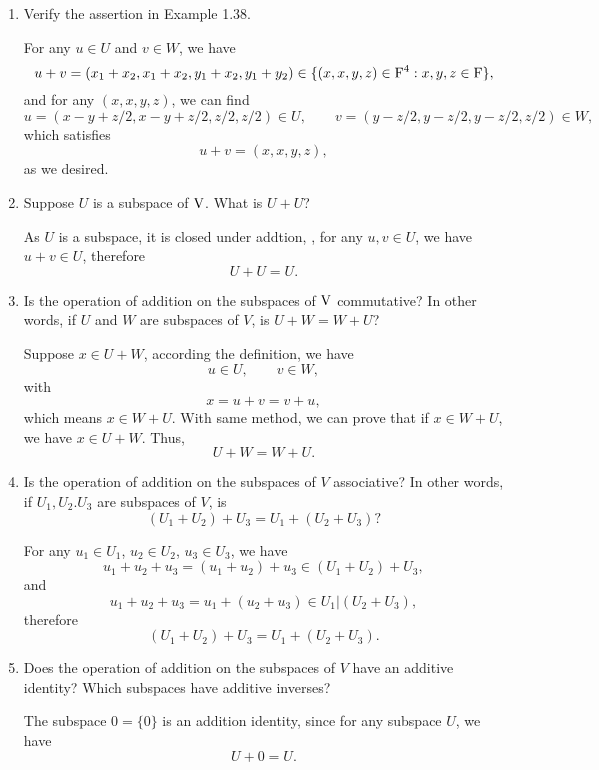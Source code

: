 \begin{enumerate}
\begin{solution}
        \end{solution}
    \item Verify the assertion in Example 1.38.
        \begin{solution}
            For any $u \in U$ and $v \in W$, we have 
            \[ u+v = (x_1+x_2, x_1+x_2, y_1 + x_2, y_1 + y_2) \in \{(x,x,y,z)\in \mathrm{F}^4:x,y,z \in \mathrm{F}\},\]
            and for any $(x,x,y,z)$, we can find 
            \[ u=(x-y+z/2,x-y+z/2,z/2,z/2) \in U,\qquad v=(y-z/2,y-z/2,y-z/2,z/2)\in W,\]
            which satisfies
            \[ u + v = (x,x,y,z),\]
            as we desired.
        \end{solution}
    \item Suppose $U$ is a subspace of $\mathrm{V}$. What is $U + U$?
        \begin{solution}
            As $U$ is a subspace, it is closed under addtion, \ie, for any $u,v \in U$,
            we have $u + v \in U$, therefore 
            \[ U + U = U.\]
        \end{solution}
    \item Is the operation of addition on the subspaces of $\mathrm{V}$ commutative? In other words, 
        if $U$ and $W$ are subspaces of $V$, is $U + W = W + U$?
        \begin{solution}
            Suppose $x \in U + W$, according the definition, we have 
            \[ u \in U, \qquad v \in W, \]
            with 
            \[ x = u + v = v + u,\]
            which means $x \in W + U$. With same method, we can prove that if $x \in W + U$, we 
            have $x \in U + W$. 
            Thus, 
            \[ U+W = W+U.\]
        \end{solution}
    \item Is the operation of addition on the subspaces of $V$ associative? In other words, if 
        $U_1, U_2. U_3$ are subspaces of $V$, is 
        \[ (U_1 + U_2) + U_3 = U_1 + (U_2 + U_3)?\]
        \begin{solution}
            For any $u_1 \in U_1$, $u_2 \in U_2$, $u_3 \in U_3$, we have 
            \[ u_1 + u_2 + u_3 = (u_1+u_2) + u_3 \in (U_1 + U_2) + U_3,\]
            and 
            \[ u_1 + u_2 + u_3 = u_1 + (u_2 + u_3) \in U_1 | (U_2 + U_3),\]
            therefore 
            \[ (U_1 + U_2) + U_3 = U_1 + (U_2 + U_3) .\]
        \end{solution}
    \item Does the operation of addition on the subspaces of $V$ have an additive identity? Which subspaces have 
        additive inverses?
        \begin{solution}
            The subspace $0=\{0\}$ is an addition identity, since for any subspace $U$, we have 
            \[ U + 0 = U .\]


\end{solution}
\end{enumerate}
